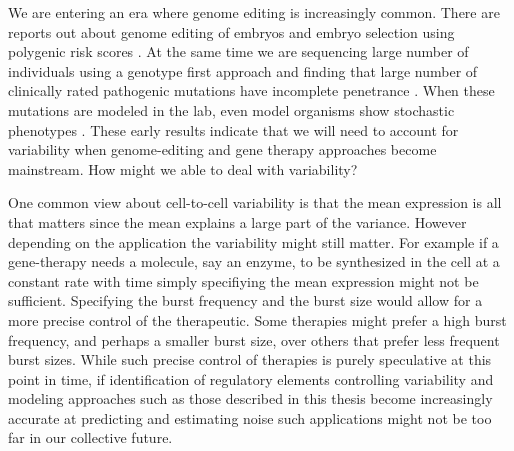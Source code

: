 We are entering an era where genome editing is increasingly common. There are reports out about genome editing of embryos and embryo selection using polygenic risk scores \cite{ma2017n} \cite{pereira2022hr}. At the same time we are sequencing large number of individuals using a genotype first approach and finding that large number of clinically rated pathogenic mutations have incomplete penetrance \cite{forrest2022j}. When these mutations are modeled in the lab, even model organisms show stochastic phenotypes \cite{marmion2023cb}. These early results indicate that we will need to account for variability when genome-editing and gene therapy approaches become mainstream. How might we able to deal with variability?

One common view about cell-to-cell variability is that the mean expression is all that matters since the mean explains a large part of the variance. However depending on the application the variability might still matter. For example if a gene-therapy needs a molecule, say an enzyme, to be synthesized in the cell at a constant rate with time simply specifiying the mean expression might not be sufficient. Specifying the burst frequency and the burst size would allow for a more precise control of the therapeutic. Some therapies might prefer a high burst frequency, and perhaps a smaller burst size, over others that prefer less frequent burst sizes. While such precise control of therapies is purely speculative at this point in time, if identification of regulatory elements controlling variability \cite{zhao2023ng} and modeling approaches such as those described in this thesis become increasingly accurate at predicting and estimating noise such applications might not be too far in our collective future.
